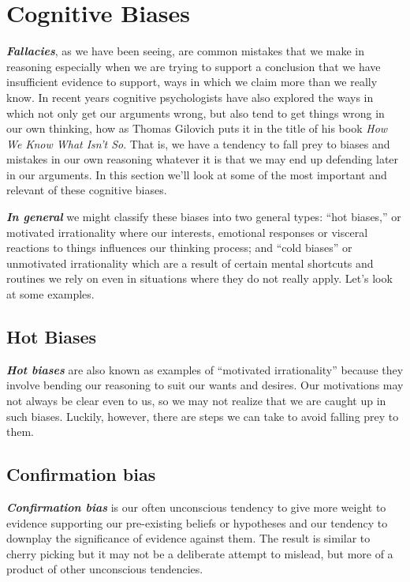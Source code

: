 \documentclass[12pt, openany]{book}
\begin{document}
\hypertarget{cognitive-biases}{%
\section{Cognitive Biases}\label{cognitive-biases}}

\textbf{\emph{Fallacies}}, as we have been seeing, are common mistakes that we make in reasoning especially when we are trying to support a conclusion that we have insufficient evidence to support, ways in which we claim more than we really know. In recent years cognitive psychologists have also explored the ways in which not only get our arguments wrong, but also tend to get things wrong in our own thinking, how as Thomas Gilovich puts it in the title of his book \emph{How We Know What Isn't So}.\citep{gilovichHowWeKnow1991} That is, we have a tendency to fall prey to biases and mistakes in our own reasoning whatever it is that we may end up defending later in our arguments. In this section we'll look at some of the most important and relevant of these cognitive biases.

\textbf{\emph{In general}} we might classify these biases into two general types: ``hot biases,'' or motivated irrationality where our interests, emotional responses or visceral reactions to things influences our thinking process; and ``cold biases'' or unmotivated irrationality which are a result of certain mental shortcuts and routines we rely on even in situations where they do not really apply. Let's look at some examples.

\hypertarget{hot-biases}{%
\subsection*{\texorpdfstring{\textbf{Hot Biases}}{Hot Biases}}\label{hot-biases}}


\textbf{\emph{Hot biases}} are also known as examples of ``motivated irrationality'' because they involve bending our reasoning to suit our wants and desires. Our motivations may not always be clear even to us, so we may not realize that we are caught up in such biases. Luckily, however, there are steps we can take to avoid falling prey to them.

\hypertarget{confirmation-bias}{%
\subsection*{Confirmation bias}\label{confirmation-bias}}


\textbf{\emph{Confirmation bias}} is our often unconscious tendency to give more weight to evidence supporting our pre-existing beliefs or hypotheses and our tendency to downplay the significance of evidence against them. The result is similar to cherry picking but it may not be a deliberate attempt to mislead, but more of a product of other unconscious tendencies.
\end{document}
